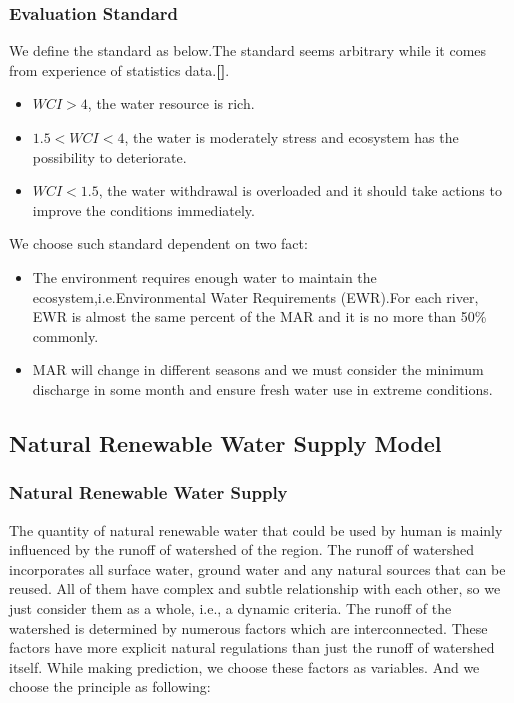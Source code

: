 \documentclass{mcmthesis}
\begin{document}
\subsubsection{Evaluation Standard}
We define the standard as below.The standard seems arbitrary while it comes from experience of statistics data.\textbf{[]}.
\begin{itemize}
\item $WCI>4$, the water resource is rich.
\item $1.5<WCI<4$, the water is moderately stress and ecosystem has the possibility to deteriorate.
\item $WCI<1.5$, the water withdrawal is overloaded and it should take actions to improve the conditions immediately.
\end{itemize}
 We choose such standard dependent on two fact:
 \begin{itemize}
\item The environment requires enough water to maintain the ecosystem,i.e.Environmental Water Requirements (EWR).For each river, EWR is almost the same percent of the MAR and it is no more than 50\% commonly. 
\item MAR will change in different seasons and we must consider the minimum discharge in some month and ensure fresh water use in extreme conditions.

\end{itemize}
\subsection{Natural Renewable Water Supply Model}
\subsubsection{Natural Renewable Water Supply}

The quantity of natural renewable water that could be used by human is mainly influenced by the runoff of watershed of the region. The runoff of watershed incorporates all surface water, ground water and any natural sources that can be reused. All of them have complex and subtle relationship with each other, so we just consider them as a whole, i.e., a dynamic criteria. The runoff of the watershed is determined by numerous factors which are interconnected. These factors have more explicit natural regulations than just the runoff of watershed itself. While making prediction, we choose these factors as variables. And we choose the principle as following: 
\end{document}
